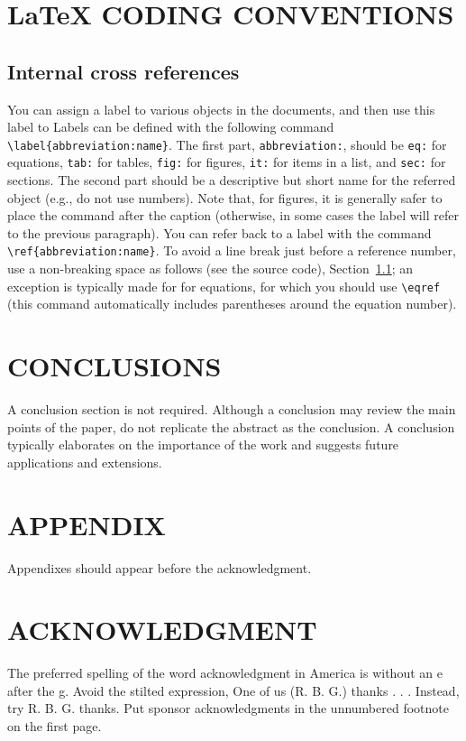 \documentclass[letterpaper, 10 pt, conference]{ieeeconf}
\begin{document}
\section{\LaTeX{} CODING CONVENTIONS}
\subsection{Internal cross references}
\label{sec:internal-xrefs}
You can assign a label to various objects in the documents, and then use this label to
Labels can be defined with the following command \verb|\label{abbreviation:name}|. The first part, \verb|abbreviation:|, should be \verb|eq:| for equations, \verb|tab:| for tables, \verb|fig:| for figures, \verb|it:| for items in a list, and \verb|sec:| for sections. The second part should be a descriptive but short name for the referred object (e.g., do not use numbers). Note that, for figures, it is generally safer to place the  command after the caption (otherwise, in some cases the label will refer to the previous paragraph).
You can refer back to a label with the command \verb|\ref{abbreviation:name}|. To avoid a line break just before a reference number, use a non-breaking space as follows (see the source code), Section~\ref{sec:internal-xrefs}; an exception is typically made for for equations, for which you should use \verb|\eqref| (this command automatically includes parentheses around the equation number).

\section{CONCLUSIONS}

A conclusion section is not required. Although a conclusion may review the main points of the paper, do not replicate the abstract as the conclusion. A conclusion typically elaborates on the importance of the work and suggests future applications and extensions.


\section*{APPENDIX}

Appendixes should appear before the acknowledgment.

\section*{ACKNOWLEDGMENT}

The preferred spelling of the word acknowledgment in America is without an e after the g. Avoid the stilted expression, One of us (R. B. G.) thanks . . .  Instead, try R. B. G. thanks. Put sponsor acknowledgments in the unnumbered footnote on the first page.
\end{document}
